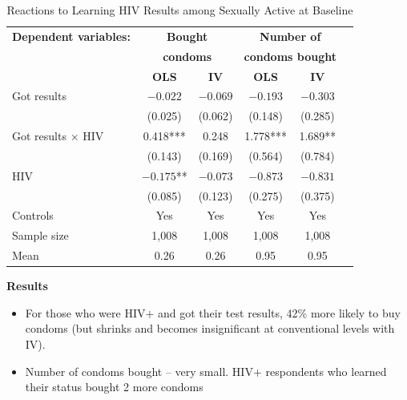 \documentclass[notes=show]{beamer}
\begin{document}
\begin{frame}[plain]

\begin{table}[htb]\centering
\scriptsize
\caption{Reactions to Learning HIV Results among Sexually Active at Baseline}
\label{tab:thornton_condoms}
\centering
\begin{threeparttable}
\begin{tabular}{l*{5}{c}}
\toprule
\multicolumn{1}{l}{\textbf{Dependent variables:}}&
\multicolumn{2}{c}{\textbf{Bought}}&
\multicolumn{2}{c}{\textbf{Number of}}\\
\multicolumn{1}{l}{}&
\multicolumn{2}{c}{\textbf{condoms}}&
\multicolumn{2}{c}{\textbf{condoms bought}}\\
\multicolumn{1}{l}{}&
\multicolumn{1}{c}{\textbf{OLS}}&
\multicolumn{1}{c}{\textbf{IV}}&
\multicolumn{1}{c}{\textbf{OLS}}&
\multicolumn{1}{c}{\textbf{IV}}\\
\midrule
Got results&$-0.022$&$-0.069$&$-0.193$&$-0.303$
\\
&(0.025)	& (0.062)		& (0.148)		& (0.285)
\\
Got results $\times$ HIV    & 0.418***	& 0.248			& 1.778***		& 1.689**		
\\
& (0.143)	& (0.169)		& (0.564)		& (0.784)		\\
HIV &$-0.175$**	&$-0.073$&$-0.873$&$-0.831$
\\
& (0.085)	& (0.123)		& (0.275)		& (0.375)		\\\midrule
Controls& 	Yes	 & 		Yes 	& Yes   &   Yes		
\\
Sample size				& 1,008	& 1,008& 1,008& 1,008  \\
Mean					& 0.26	& 0.26	& 0.95	& 0.95 \\
\bottomrule
\end{tabular}
\end{threeparttable}
\end{table}

\end{frame}

\begin{frame}[plain]
\begin{center}
\textbf{Results}
\end{center}

\begin{itemize}
\item For those who were HIV$+$ and got their test results, 42\% more likely to buy condoms (but shrinks and becomes insignificant at conventional levels with IV). 
\item Number of condoms bought -- very small. HIV$+$ respondents who learned their status bought 2 more condoms
\end{itemize}

\end{frame}
\end{document}
